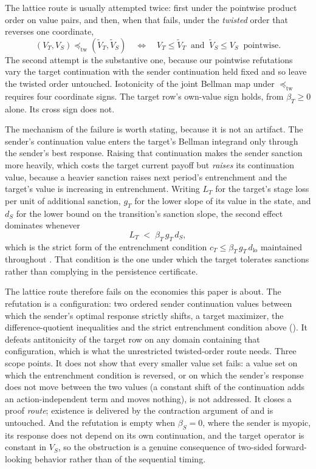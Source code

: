 \begin{remark}
\label{rem:twisted-order}
The lattice route is usually attempted twice: first under the pointwise product
order on value pairs, and then, when that fails, under the \emph{twisted}
order that reverses one coordinate,
\[
  (V_T,V_S)\preceq_{\mathrm{tw}}(\tilde V_T,\tilde V_S)
  \quad\Longleftrightarrow\quad
  V_T\le \tilde V_T \ \text{ and }\ \tilde V_S\le V_S \ \text{ pointwise.}
\]
The second attempt is the substantive one, because our pointwise refutations
vary the target continuation with the sender continuation held fixed and so
leave the twisted order untouched. Isotonicity of the joint Bellman map under
$\preceq_{\mathrm{tw}}$ requires four coordinate signs. The target row's
own-value sign holds, from $\beta_T\ge0$ alone. Its cross sign does not.

The mechanism of the failure is worth stating, because it is not an artifact.
The sender's continuation value enters the target's Bellman integrand only
through the sender's best response. Raising that continuation makes the sender
sanction more heavily, which costs the target current payoff but \emph{raises}
its continuation value, because a heavier sanction raises next period's
entrenchment and the target's value is increasing in entrenchment. Writing $L_T$
for the target's stage loss per unit of additional sanction, $g_T$ for the lower
slope of its value in the state, and $d_S$ for the lower bound on the transition's
sanction slope, the second effect dominates whenever
\[
  L_T \;<\; \beta_T\,g_T\,d_S ,
\]
which is the strict form of the entrenchment condition
$c_T\le\beta_T\,g_T\,d_{\mathrm{lo}}$ maintained throughout
. That condition is the one under which the target
tolerates sanctions rather than complying in the persistence certificate.

The lattice route therefore fails on the economies this paper is about. The
refutation is a configuration: two ordered sender continuation values between
which the sender's optimal response strictly shifts, a target maximizer, the
difference-quotient inequalities and the strict entrenchment condition above
(). It defeats antitonicity of
the target row on any domain containing that configuration, which is what the
unrestricted twisted-order route needs. Three scope points. It does not show
that every smaller value set fails: a value set on which the entrenchment condition is reversed, or
on which the sender's response does not move between the two values (a constant
shift of the continuation adds an action-independent term and moves nothing),
is not addressed. It closes a proof \emph{route}; existence is delivered by
the contraction argument of  and is untouched. And the
refutation is empty when
$\beta_S=0$, where the sender is myopic, its response does not depend on its own
continuation, and the target operator is constant in $V_S$, so the obstruction
is a genuine consequence of two-sided forward-looking behavior rather than of
the sequential timing.
\end{remark}



